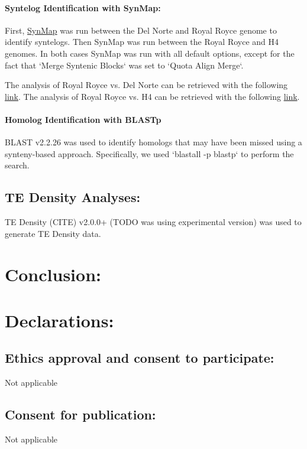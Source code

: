\documentclass[fleqn,10pt]{olplainarticle}
\begin{document}
\paragraph{Syntelog Identification with SynMap:} \label{sec:methods_syntelogs}
First, \href{https://genomevolution.org/CoGe/SynMap.pl}{SynMap} was run between the Del Norte and Royal Royce genome to identify syntelogs.
Then SynMap was run between the Royal Royce and H4 genomes.
In both cases SynMap was run with all default options, except for the fact that `Merge Syntenic Blocks` was set to `Quota Align Merge`.

The analysis of Royal Royce vs. Del Norte can be retrieved with the following \href{ https://genomevolution.org/r/1r9uk}{link}.
The analysis of Royal Royce vs. H4 can be retrieved with the following \href{https://genomevolution.org/r/1r9uy}{link}.

\paragraph{Homolog Identification with BLASTp} \label{sec:methods_homologs}
BLAST v2.2.26 was used to identify homologs that may have been missed using a synteny-based approach.
Specifically, we used `blastall -p blastp` to perform the search. 

\subsection{TE Density Analyses:}
TE Density (CITE) v2.0.0+ (TODO was using experimental version) was used to generate TE Density data.

\section{Conclusion:}

\section{Declarations:}
\subsection{Ethics approval and consent to participate:}
Not applicable

\subsection{Consent for publication:}
Not applicable
\end{document}
